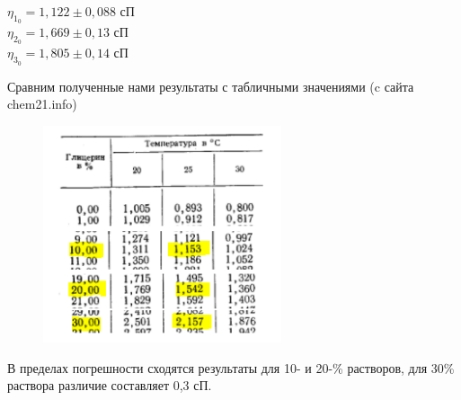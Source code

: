 \documentclass[a4paper]{article}
\begin{document}
\begin{enumerate}
    \begin{center}
    $\eta_1_0 = 1,122 \pm 0,088$ сП\\
    $\eta_2_0 = 1,669 \pm 0,13$ сП\\
    $\eta_3_0 = 1,805 \pm 0,14$ сП\\
    \end{center}
    
    Сравним полученные нами результаты с табличными значениями (c сайта chem21.info)
    
    \begin{figure}[h]
    \centering
    \includegraphics[width=70mm]{table.png}
    \label{fig:vac}
    \end{figure}
    
    В пределах погрешности сходятся результаты для 10- и 20-\% растворов, для 30\% раствора различие составляет 0,3 сП.

\end{enumerate}
\end{document}
